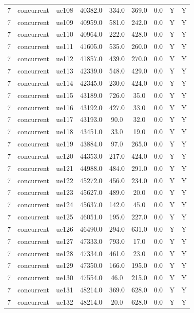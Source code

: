 \begin{table}[ht]
\begin{tabular}{|c|c|c|c|c|c|c|c|c|}
7 & concurrent & ue108 & 40382.0 & 334.0 & 369.0 & 0.0 & Y & Y \\
7 & concurrent & ue109 & 40959.0 & 581.0 & 242.0 & 0.0 & Y & Y \\
7 & concurrent & ue110 & 40964.0 & 222.0 & 428.0 & 0.0 & Y & Y \\
7 & concurrent & ue111 & 41605.0 & 535.0 & 260.0 & 0.0 & Y & Y \\
7 & concurrent & ue112 & 41857.0 & 439.0 & 270.0 & 0.0 & Y & Y \\
7 & concurrent & ue113 & 42339.0 & 548.0 & 429.0 & 0.0 & Y & Y \\
7 & concurrent & ue114 & 42345.0 & 230.0 & 424.0 & 0.0 & Y & Y \\
7 & concurrent & ue115 & 43189.0 & 726.0 & 35.0 & 0.0 & Y & Y \\
7 & concurrent & ue116 & 43192.0 & 427.0 & 33.0 & 0.0 & Y & Y \\
7 & concurrent & ue117 & 43193.0 & 90.0 & 32.0 & 0.0 & Y & Y \\
7 & concurrent & ue118 & 43451.0 & 33.0 & 19.0 & 0.0 & Y & Y \\
7 & concurrent & ue119 & 43884.0 & 97.0 & 265.0 & 0.0 & Y & Y \\
7 & concurrent & ue120 & 44353.0 & 217.0 & 424.0 & 0.0 & Y & Y \\
7 & concurrent & ue121 & 44988.0 & 484.0 & 291.0 & 0.0 & Y & Y \\
7 & concurrent & ue122 & 45272.0 & 456.0 & 234.0 & 0.0 & Y & Y \\
7 & concurrent & ue123 & 45627.0 & 489.0 & 20.0 & 0.0 & Y & Y \\
7 & concurrent & ue124 & 45637.0 & 142.0 & 45.0 & 0.0 & Y & Y \\
7 & concurrent & ue125 & 46051.0 & 195.0 & 227.0 & 0.0 & Y & Y \\
7 & concurrent & ue126 & 46490.0 & 294.0 & 631.0 & 0.0 & Y & Y \\
7 & concurrent & ue127 & 47333.0 & 793.0 & 17.0 & 0.0 & Y & Y \\
7 & concurrent & ue128 & 47334.0 & 461.0 & 23.0 & 0.0 & Y & Y \\
7 & concurrent & ue129 & 47350.0 & 166.0 & 195.0 & 0.0 & Y & Y \\
7 & concurrent & ue130 & 47554.0 & 46.0 & 215.0 & 0.0 & Y & Y \\
7 & concurrent & ue131 & 48214.0 & 369.0 & 628.0 & 0.0 & Y & Y \\
7 & concurrent & ue132 & 48214.0 & 20.0 & 628.0 & 0.0 & Y & Y \\

\end{tabular}
\end{table}

